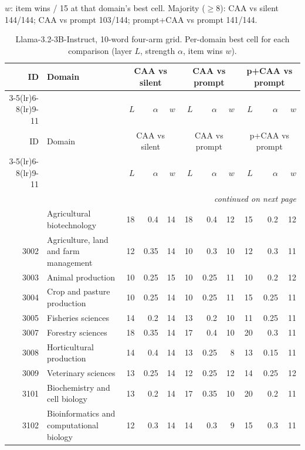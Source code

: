 {\small $w$: item wins / 15 at that domain's best cell. Majority ($\geq 8$): CAA vs silent 144/144; CAA vs prompt 103/144; prompt+CAA vs prompt 141/144.}


\vspace{1.2em}
\begin{longtable}{r p{2.15cm} rrr rrr rrr}
\caption{Llama-3.2-3B-Instruct, 10-word four-arm grid. Per-domain best cell for each comparison (layer $L$, strength $\alpha$, item wins $w$).}
\label{tab:app-3b} \\
\toprule
ID & Domain & \multicolumn{3}{c}{CAA vs silent} & \multicolumn{3}{c}{CAA vs prompt} & \multicolumn{3}{c}{p+CAA vs prompt} \\
\cmidrule(lr){3-5}\cmidrule(lr){6-8}\cmidrule(lr){9-11}
 & & $L$ & $\alpha$ & $w$ & $L$ & $\alpha$ & $w$ & $L$ & $\alpha$ & $w$ \\
\midrule
\endfirsthead
\toprule
ID & Domain & \multicolumn{3}{c}{CAA vs silent} & \multicolumn{3}{c}{CAA vs prompt} & \multicolumn{3}{c}{p+CAA vs prompt} \\
\cmidrule(lr){3-5}\cmidrule(lr){6-8}\cmidrule(lr){9-11}
 & & $L$ & $\alpha$ & $w$ & $L$ & $\alpha$ & $w$ & $L$ & $\alpha$ & $w$ \\
\midrule
\endhead
\midrule
\multicolumn{11}{r}{\emph{continued on next page}} \\
\endfoot
\bottomrule
\endlastfoot
3001 & Agricultural biotechnology & 18 & 0.4 & 14 & 18 & 0.4 & 12 & 15 & 0.2 & 12 \\
3002 & Agriculture, land and farm management & 12 & 0.35 & 14 & 10 & 0.3 & 10 & 12 & 0.3 & 11 \\
3003 & Animal production & 10 & 0.25 & 15 & 10 & 0.25 & 11 & 10 & 0.2 & 12 \\
3004 & Crop and pasture production & 10 & 0.25 & 14 & 10 & 0.25 & 11 & 15 & 0.25 & 11 \\
3005 & Fisheries sciences & 14 & 0.2 & 14 & 13 & 0.2 & 10 & 11 & 0.25 & 11 \\
3007 & Forestry sciences & 18 & 0.35 & 14 & 17 & 0.4 & 10 & 20 & 0.3 & 11 \\
3008 & Horticultural production & 14 & 0.4 & 14 & 13 & 0.25 & 8 & 13 & 0.15 & 11 \\
3009 & Veterinary sciences & 13 & 0.25 & 14 & 12 & 0.25 & 12 & 14 & 0.25 & 12 \\
3101 & Biochemistry and cell biology & 13 & 0.2 & 14 & 17 & 0.35 & 10 & 20 & 0.2 & 11 \\
3102 & Bioinformatics and computational biology & 12 & 0.3 & 14 & 14 & 0.3 & 9 & 15 & 0.3 & 11 \\

\end{longtable}
